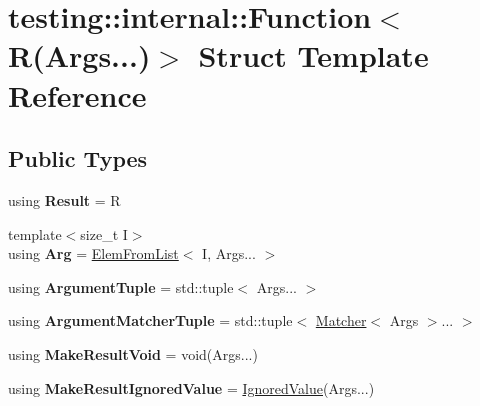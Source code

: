 \hypertarget{structtesting_1_1internal_1_1Function_3_01R_07Args_8_8_8_08_4}{}\section{testing\+:\+:internal\+:\+:Function$<$ R(Args...)$>$ Struct Template Reference}
\label{structtesting_1_1internal_1_1Function_3_01R_07Args_8_8_8_08_4}
\subsection*{Public Types}
\begin{DoxyCompactItemize}
\item 
\mbox{\label{structtesting_1_1internal_1_1Function_3_01R_07Args_8_8_8_08_4_a71efbc408f9ce64e36e2cc41df0da194}} 
using {\bfseries Result} = R
\item 
\mbox{\label{structtesting_1_1internal_1_1Function_3_01R_07Args_8_8_8_08_4_aacb86abf5791077bc9f3774fa0240ba2}} 
{\footnotesize template$<$size\+\_\+t I$>$ }\\using {\bfseries Arg} = \mbox{\hyperlink{structtesting_1_1internal_1_1ElemFromList}{Elem\+From\+List}}$<$ I, Args... $>$
\item 
\mbox{\label{structtesting_1_1internal_1_1Function_3_01R_07Args_8_8_8_08_4_afc6bddfcfc78f9308c268123ebc2a99b}} 
using {\bfseries Argument\+Tuple} = std\+::tuple$<$ Args... $>$
\item 
\mbox{\label{structtesting_1_1internal_1_1Function_3_01R_07Args_8_8_8_08_4_aa1b4dca988b45fea2307518af5ac8a09}} 
using {\bfseries Argument\+Matcher\+Tuple} = std\+::tuple$<$ \mbox{\hyperlink{classtesting_1_1Matcher}{Matcher}}$<$ Args $>$... $>$
\item 
\mbox{\label{structtesting_1_1internal_1_1Function_3_01R_07Args_8_8_8_08_4_a763920d3647641e1100bc4ade26d1d0c}} 
using {\bfseries Make\+Result\+Void} = void(Args...)
\item 
\mbox{\label{structtesting_1_1internal_1_1Function_3_01R_07Args_8_8_8_08_4_a23361a5e5eb49aad2e1dfe784e60b5da}} 
using {\bfseries Make\+Result\+Ignored\+Value} = \mbox{\hyperlink{classtesting_1_1internal_1_1IgnoredValue}{Ignored\+Value}}(Args...)
\end{DoxyCompactItemize}
